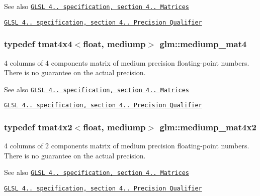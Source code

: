 \begin{DoxySeeAlso}{See also}
\href{http://www.opengl.org/registry/doc/GLSLangSpec.4.20.8.pdf}{\tt G\+L\+S\+L 4.. specification, section 4.. Matrices} 

\href{http://www.opengl.org/registry/doc/GLSLangSpec.4.20.8.pdf}{\tt G\+L\+S\+L 4.. specification, section 4.. Precision Qualifier} 
\end{DoxySeeAlso}
\hypertarget{namespaceglm_a16b7f3efa843e157a6d8c93acbb432c9}{}
\subsubsection[{mediump\+\_\+mat4}]{\setlength{\rightskip}{0pt plus 5cm}typedef tmat4x4$<$float, mediump$>$ {\bf glm\+::mediump\+\_\+mat4}}\label{namespaceglm_a16b7f3efa843e157a6d8c93acbb432c9}
4 columns of 4 components matrix of medium precision floating-\/point numbers. There is no guarantee on the actual precision.

\begin{DoxySeeAlso}{See also}
\href{http://www.opengl.org/registry/doc/GLSLangSpec.4.20.8.pdf}{\tt G\+L\+S\+L 4.. specification, section 4.. Matrices} 

\href{http://www.opengl.org/registry/doc/GLSLangSpec.4.20.8.pdf}{\tt G\+L\+S\+L 4.. specification, section 4.. Precision Qualifier} 
\end{DoxySeeAlso}
\hypertarget{namespaceglm_a9e874a0ff9902e20096455fe72f494f5}{}
\subsubsection[{mediump\+\_\+mat4x2}]{\setlength{\rightskip}{0pt plus 5cm}typedef tmat4x2$<$float, mediump$>$ {\bf glm\+::mediump\+\_\+mat4x2}}\label{namespaceglm_a9e874a0ff9902e20096455fe72f494f5}
4 columns of 2 components matrix of medium precision floating-\/point numbers. There is no guarantee on the actual precision.

\begin{DoxySeeAlso}{See also}
\href{http://www.opengl.org/registry/doc/GLSLangSpec.4.20.8.pdf}{\tt G\+L\+S\+L 4.. specification, section 4.. Matrices} 

\href{http://www.opengl.org/registry/doc/GLSLangSpec.4.20.8.pdf}{\tt G\+L\+S\+L 4.. specification, section 4.. Precision Qualifier} 
\end{DoxySeeAlso}
\hypertarget{namespaceglm_a25249273959c0b7c96e981ffdcd17dde}{}
